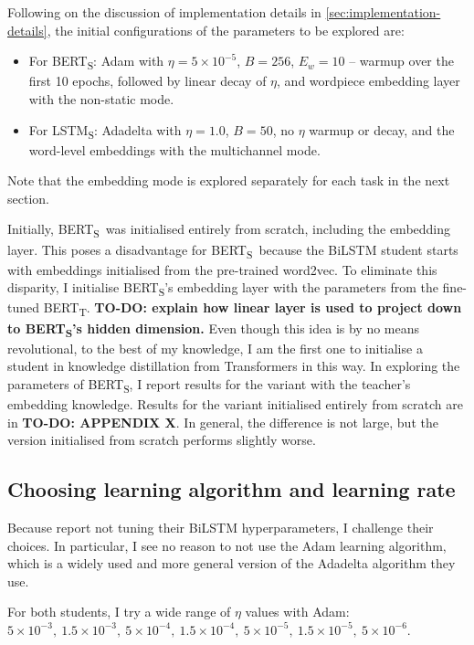 \documentclass[bsc,frontabs,twoside,singlespacing,parskip,deptreport]{infthesis}
\def\BERTT{BERT\textsubscript{T}}
\def\BERTS{BERT\textsubscript{S}}
\def\LSTMS{LSTM\textsubscript{S}}
\begin{document}
{{      %

    Following on the discussion of implementation details in \autoref{sec:implementation-details}, the initial configurations of the parameters to be explored are:
    \begin{itemize}
      \item For \BERTS: Adam with $\eta=5\times10^{-5}$, $B=256$, $E_{w}=10$ -- warmup over the first 10 epochs, followed by linear decay of $\eta$, and wordpiece embedding layer with the non-static mode.
      \item For \LSTMS: Adadelta with $\eta=1.0$, $B=50$, no $\eta$ warmup or decay, and the word-level embeddings with the multichannel mode.
    \end{itemize}
    Note that the embedding mode is explored separately for each task in the next section.

    Initially, \BERTS~was initialised entirely from scratch, including the embedding layer. 
    This poses a disadvantage for \BERTS~because the BiLSTM student starts with embeddings initialised from the pre-trained word2vec. To eliminate this disparity, I initialise \BERTS's embedding layer with the parameters from the fine-tuned \BERTT. \textbf{TO-DO: explain how linear layer is used to project down to \BERTS's hidden dimension.}
    Even though this idea is by no means revolutional, to the best of my knowledge, I am the first one to initialise a student in knowledge distillation from Transformers in this way.
    In exploring the parameters of \BERTS, I report results for the variant with the teacher's embedding knowledge. Results for the variant initialised entirely from scratch are in \textbf{TO-DO: APPENDIX X}.
    In general, the difference is not large, but the version initialised from scratch performs slightly worse.
    
    \subsection{Choosing learning algorithm and learning rate}{
      Because \citet{Tang_2019b} report not tuning their BiLSTM hyperparameters, I challenge their choices.
      In particular, I see no reason to not use the Adam learning algorithm, which is a widely used and more general version of the Adadelta algorithm they use.

      For both students, I try a wide range of $\eta$ values with Adam: $5\times10^{-3},\ 1.5\times10^{-3},\ 5\times10^{-4},\ 1.5\times10^{-4},\ 5\times10^{-5},\ 1.5\times10^{-5},\ 5\times10^{-6}$.
      
}}}
\end{document}
